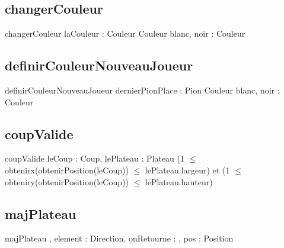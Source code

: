         
     	\subsection{changerCouleur}
     \begin{algorithme}
     	\fonction
     	{changerCouleur}
     	{laCouleur : Couleur}
     	{Couleur}
     	{blanc, noir : Couleur}
     	{
     		{
     		}
     		{
     		}
     	}
     \end{algorithme}
     \subsection{definirCouleurNouveauJoueur}
     \begin{algorithme}
     	\fonction
     	{definirCouleurNouveauJoueur}
     	{dernierPionPlace : Pion}
     	{Couleur}
     	{blanc, noir : Couleur}
     	{
     	}
     \end{algorithme}
     
     \subsection{coupValide}
     \begin{algorithme}
     	\fonctionAvecPreconditions
     	{coupValide}
     	{leCoup : Coup, lePlateau : Plateau}
     	{\booleen}
     	{(1 $\leqslant$ obtenirx(obtenirPosition(leCoup)) $\leqslant$ lePlateau.largeur) et (1 $\leqslant$ obteniry(obtenirPosition(leCoup)) $\leqslant$  lePlateau.hauteur)}
     	{}
     	{
     		{
     		}
     		{
     		}
     	}
     \end{algorithme}
     
     \subsection{majPlateau}
     \begin{algorithme}
     	\procedure
     	{majPlateau}
     	{, }
     	{element : Direction, onRetourne : \booleen, pos : Position}
     	{
     		{
     			{
     				
     				{
     				}
     			}	
     		}
     	}
     	
     \end{algorithme}
     
